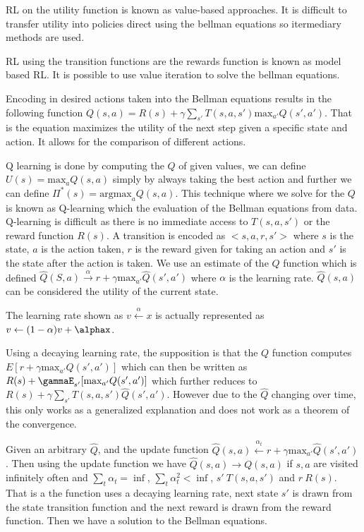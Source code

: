 \documentclass{article}
\begin{document}
RL  on the utility function is known as value-based approaches. It is
difficult to transfer utility into policies direct using the bellman
equations so itermediary methods are used.

RL using the transition functions are the rewards function is known as model
based RL. It is possible to use value iteration to solve the bellman equations.


Encoding in desired actions taken into the Bellman equations results in the
following function $Q(s,a) = R(s) + \gamma\sum_{s'}T(s,a,s')\text{max}_{a'}Q(s',
a')$. That is the equation maximizes the utility of the next step given a
specific state and action. It allows for the comparison of different actions.

Q learning is done by computing the $Q$ of given values, we can define $U(s) =
\text{max}_aQ(s,a)$ simply by always taking the best action and further we can
define $\Pi^*(s) = \text{argmax}_aQ(s,a)$. This technique where we solve for the
$Q$ is known as Q-learning which the evaluation of the Bellman equations from
data.
Q-learning is difficult as there is no immediate access to $T(s,a,s')$ or the reward function $R(s)$.  A transition is encoded as $<s,a,r,s'>$ where $s$ is the state, $a$ is the action taken, $r$ is the reward given for taking an action and $s'$ is the
state after the action is taken. We use an estimate of the $Q$ function which
is defined $\hat{Q}(S,a) \xrightarrow{\alpha} r + \gamma\text{max}_{a'}\hat{Q}(s
',a')$ where $\alpha$ is the learning rate. $\hat{Q}(s,a)$ can be considered the
utility of the current state.

The learning rate shown as $v \xleftarrow{\alpha} x$ is actually represented as
$v \leftarrow (1 - \alpha)v + \alphax$.

Using a decaying learning rate, the supposition is that the $Q$ function
computes $E[r + \gamma\text{max}_{a'}Q(s',a')]$ which can then be written as
$R(s) + \gammaE_{s'}[\text{max}_{a'}Q(s',a')]$ which further reduces to $R(s) +
\gamma\sum_{s'}T(s,a,s')\hat{Q}(s',a')$. However due to the $\hat{Q}$ changing
over time, this only works as a generalized explanation and does not work as
a theorem of the convergence.

Given an arbitrary $\hat{Q}$, and the update function $\hat{Q}(s,a) \xleftarrow{
\alpha_t} r + \gamma\text{max}_{a'}\hat{Q}(s',a')$. Then using the update
function we have $\hat{Q}(s,a) \rightarrow Q(s,a)$ if $s,a$ are visited
infinitely often and $\sum_t \alpha_t = \inf$, $\sum_t \alpha_t^2 < \inf$, $s'
~ T(s,a,s')$ and $r ~ R(s)$. That is a the function uses a decaying learning
rate, next state $s'$ is drawn from the state transition function and the next
reward is drawn from the reward function. Then we have a solution to the
Bellman equations.
\end{document}
